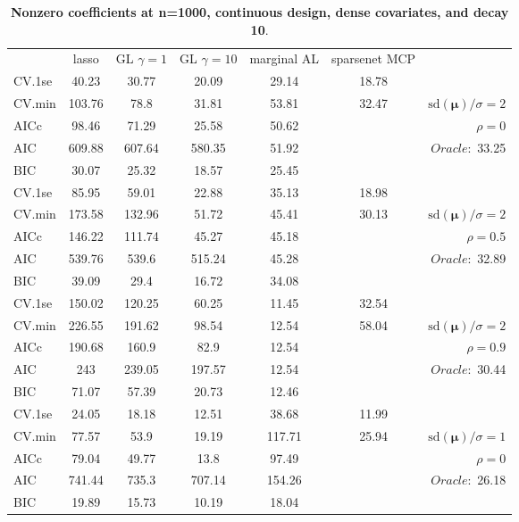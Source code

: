 \begin{table}\vspace{-.5cm}
\caption[l]{ { \bf Nonzero coefficients at n=1000, continuous design, 
dense covariates, and  decay  10}.}
\vspace{-.5cm}
\footnotesize{}
\begin{center}
\begin{tabular}{l*{5}{c}|r}
& lasso & GL $\gamma=1$ & GL $\gamma=10$ & marginal AL & sparsenet MCP  & \\
 \cline{1-7}
CV.1se & 40.23 & 30.77 & 20.09 & 29.14 & 18.78 & \\
CV.min & 103.76 & 78.8 & 31.81 & 53.81 & 32.47 &  $\mathrm{sd}(\mathbf{\mu})/\sigma=2$ \\
AICc & 98.46 & 71.29 & 25.58 & 50.62 & & $\rho=0$ \\
AIC & 609.88 & 607.64 & 580.35 & 51.92 & &  \multirow{2}{*}{$Oracle: $ 33.25} \\
BIC & 30.07 & 25.32 & 18.57 & 25.45 & &  \\
 \hline 
CV.1se & 85.95 & 59.01 & 22.88 & 35.13 & 18.98 & \\
CV.min & 173.58 & 132.96 & 51.72 & 45.41 & 30.13 &  $\mathrm{sd}(\mathbf{\mu})/\sigma=2$ \\
AICc & 146.22 & 111.74 & 45.27 & 45.18 & & $\rho=0.5$ \\
AIC & 539.76 & 539.6 & 515.24 & 45.28 & &  \multirow{2}{*}{$Oracle: $ 32.89} \\
BIC & 39.09 & 29.4 & 16.72 & 34.08 & &  \\
 \hline 
CV.1se & 150.02 & 120.25 & 60.25 & 11.45 & 32.54 & \\
CV.min & 226.55 & 191.62 & 98.54 & 12.54 & 58.04 &  $\mathrm{sd}(\mathbf{\mu})/\sigma=2$ \\
AICc & 190.68 & 160.9 & 82.9 & 12.54 & & $\rho=0.9$ \\
AIC & 243 & 239.05 & 197.57 & 12.54 & &  \multirow{2}{*}{$Oracle: $ 30.44} \\
BIC & 71.07 & 57.39 & 20.73 & 12.46 & &  \\
 \hline 
CV.1se & 24.05 & 18.18 & 12.51 & 38.68 & 11.99 & \\
CV.min & 77.57 & 53.9 & 19.19 & 117.71 & 25.94 &  $\mathrm{sd}(\mathbf{\mu})/\sigma=1$ \\
AICc & 79.04 & 49.77 & 13.8 & 97.49 & & $\rho=0$ \\
AIC & 741.44 & 735.3 & 707.14 & 154.26 & &  \multirow{2}{*}{$Oracle: $ 26.18} \\
BIC & 19.89 & 15.73 & 10.19 & 18.04 & &  \\

\end{tabular}
\end{center}
\end{table}
